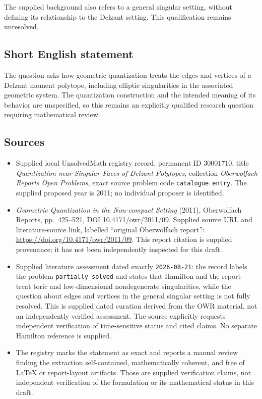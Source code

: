\documentclass[11pt]{article}
\begin{document}
The supplied background also refers to a general singular setting, without defining its relationship to the Delzant setting. This qualification remains unresolved.
\subsection{Short English statement}
The question asks how geometric quantization treats the edges and vertices of a Delzant moment polytope, including elliptic singularities in the associated geometric system. The quantization construction and the intended meaning of its behavior are unspecified, so this remains an explicitly qualified research question requiring mathematical review.
\subsection{Sources}
\begin{itemize}
\item Supplied local UnsolvedMath registry record, permanent ID \(30001710\), title \emph{Quantization near Singular Faces of Delzant Polytopes}, collection \emph{Oberwolfach Reports Open Problems}, exact source problem code \texttt{catalogue entry}. The supplied proposed year is 2011; no individual proposer is identified.
\item \emph{Geometric Quantization in the Non-compact Setting} (2011), Oberwolfach Reports, pp.\ 425--521, DOI 10.4171/owr/2011/09. Supplied source URL and literature-source link, labelled ``original Oberwolfach report'': \url{https://doi.org/10.4171/owr/2011/09}. This report citation is supplied provenance; it has not been independently inspected for this draft.
\item Supplied literature assessment dated exactly \texttt{2026-08-21}: the record labels the problem \texttt{partially\_solved} and states that Hamilton and the report treat toric and low-dimensional nondegenerate singularities, while the question about edges and vertices in the general singular setting is not fully resolved. This is supplied dated curation derived from the OWR material, not an independently verified assessment. The source explicitly requests independent verification of time-sensitive status and cited claims. No separate Hamilton reference is supplied.
\item The registry marks the statement as exact and reports a manual review finding the extraction self-contained, mathematically coherent, and free of LaTeX or report-layout artifacts. Those are supplied verification claims, not independent verification of the formulation or its mathematical status in this draft.
\end{itemize}
\end{document}

